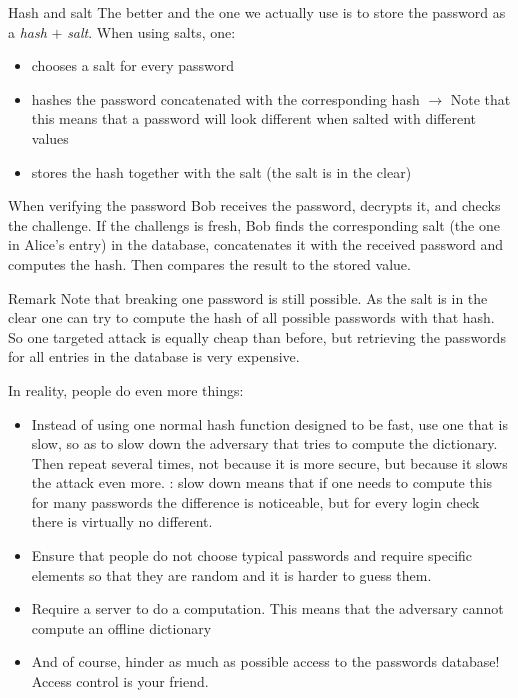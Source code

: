 \begin{parag}{Hash and salt}
    The better and the one we actually use is to store the password as a \textit{hash} $+$ \textit{salt}. When using salts, one:
	\begin{itemize}
	    \item chooses a salt for every password
	    \item hashes the password concatenated with the corresponding hash $\to$ Note that this means that a password will look different when salted with different values
	    \item stores the hash together with the salt (the salt is in the clear)
	\end{itemize}
	When verifying the password Bob receives the password, decrypts it, and checks the challenge. If the challengs is fresh, Bob finds the corresponding salt (the one in Alice's entry) in the database, concatenates it with the received password and computes the hash. Then compares the result to the stored value.
	\begin{subparag}{Remark}
	    Note that breaking one password is still possible. As the salt is in the clear one can try to compute the hash of all possible passwords with that hash. So one targeted attack is equally cheap than before, but retrieving the passwords for all entries in the database is very expensive.
	\end{subparag}
	In reality, people do even more things:
	\begin{itemize}
	    \item Instead of using one normal hash function designed to be fast, use one that is slow, so as to slow down the adversary that tries to compute the dictionary. Then repeat several times, not because it is more secure, but because it slows the attack even more. : slow down means that if one needs to compute this for many passwords the difference is noticeable, but for every login check there is virtually no different.
	    \item Ensure that people do not choose typical passwords and require specific elements so that they are random and it is harder to guess them.
	    \item Require a server to do a computation. This means that the adversary cannot compute an offline dictionary
	    \item And of course, hinder as much as possible access to the passwords database! Access control is your friend.
	\end{itemize}
	
\end{parag}




